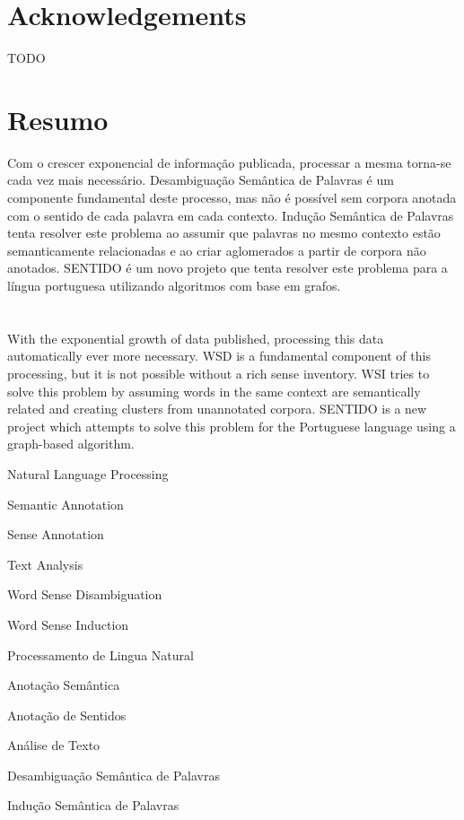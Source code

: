 \cleardoublepage
\chapter*{Acknowledgements}
TODO

\cleardoublepage
\chapter*{Resumo}
Com o crescer exponencial de informação publicada, processar a mesma torna-se
cada vez mais necessário. Desambiguação Semântica de Palavras é um componente
fundamental deste processo, mas não é possível sem corpora anotada com o sentido
de cada palavra em cada contexto. Indução Semântica de Palavras tenta resolver
este problema ao assumir que palavras no mesmo contexto estão semanticamente
relacionadas e ao criar aglomerados a partir de corpora não anotados.
\acf*{SENTIDO} é um novo projeto que tenta resolver este problema para a língua
portuguesa utilizando algoritmos com base em grafos.

\cleardoublepage
\chapter*{\abstractname}
With the exponential growth of data published, processing this data
automatically ever more necessary. \acf*{WSD} is a fundamental component of this
processing, but it is not possible without a rich sense inventory. \acf*{WSI}
tries to solve this problem by assuming words in the same context are
semantically related and creating clusters from unannotated corpora.
\acf*{SENTIDO} is a new project which attempts to solve this problem for the
Portuguese language using a graph-based algorithm.

\cleardoublepage
{}
\begin{keywords}
Natural Language Processing

Semantic Annotation

Sense Annotation

Text Analysis

Word Sense Disambiguation

Word Sense Induction

\bigskip
\bigskip

Processamento de Lingua Natural

Anotação Semântica

Anotação de Sentidos

Análise de Texto

Desambiguação Semântica de Palavras

Indução Semântica de Palavras
\end{keywords}

